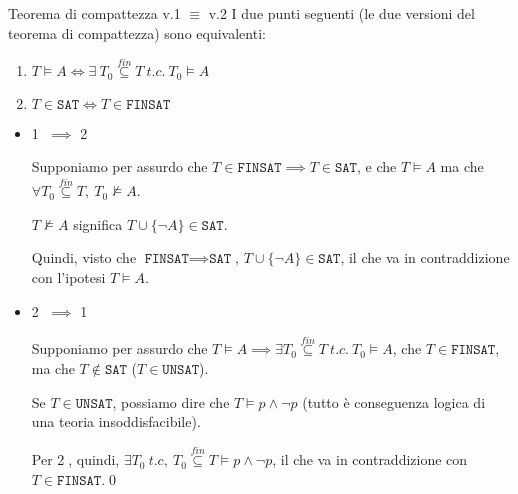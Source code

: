 \documentclass[a4paper,11pt]{report}
\begin{document}
\begin{lemmabox}{Teorema di compattezza v.1 \( \equiv \) v.2}{}
    I due punti seguenti (le due versioni del teorema di compattezza) sono equivalenti:
    \begin{enumerate}
        \item \( T \vDash A \iff \exists \ T_0 \overset{fin}{\subseteq} T \ t.c. \  T_0 \vDash A\)
        \item \( T \in \texttt{SAT} \iff T \in \texttt{FINSAT} \)
    \end{enumerate}

    \begin{proofbox}[title=dim.]{}
        \begin{itemize}
            \item \textcircled{1} \( \implies \) \textcircled{2}

                Supponiamo per assurdo che \( T \in \texttt{FINSAT} \implies T \in \texttt{SAT} \), e che \( T \vDash A \) ma che \( \forall T_0 \overset{fin}{\subseteq } T, \ T_0 \not\vDash A \).

                \( T \not\vDash A \) significa \( T \cup \{\neg A\} \in \texttt{SAT} \).
                
                Quindi, visto che \( \texttt{FINSAT} \implies \texttt{SAT} \), \( T \cup \{ \neg A\} \in \texttt{SAT}\), il che va in contraddizione con l'ipotesi \( T \vDash A \).
            \item \textcircled{2} \( \implies \) \textcircled{1}

                Supponiamo per assurdo che \( T\vDash A \implies \exists T_0  \overset{fin}{\subseteq } T \ t.c. \ T_0 \vDash A\), che \( T\in \texttt{FINSAT} \), ma che \( T\not \in \texttt{SAT} \) (\( T\in \texttt{UNSAT} \)).

                Se \( T \in \texttt{UNSAT} \), possiamo dire che \( T \vDash p \land \neg p \) {\small \color{gray} (tutto è conseguenza logica di una teoria insoddisfacibile)}.

                Per \textcircled{2}, quindi, \( \exists T_0 \ t.c, \ T_0 \overset{fin}{\subseteq } T \vDash p \land \neg p \), il che va in contraddizione con \( T \in \texttt{FINSAT} \).\qed
        \end{itemize}

    \end{proofbox}

\end{lemmabox}
\end{document}
